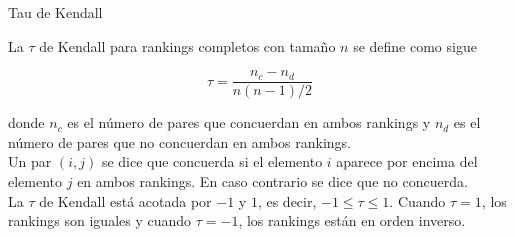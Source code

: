\documentclass[10pt]{beamer}
\begin{document}
	\begin{frame}{Tau de Kendall}
		\begin{defi}
			La $\tau$ de Kendall para rankings completos con tamaño $n$ se define como sigue
			
			\begin{equation} \label{def:tau_kendall}
			\tau = \dfrac{n_c - n_d}{n(n-1)/2}
			\end{equation}
			
			donde $n_c$ es el número de pares que concuerdan en ambos rankings y $n_d$ es el número de pares que no concuerdan en ambos rankings.\\
			
			Un par $(i,j)$ se dice que concuerda si el elemento $i$ aparece por encima del elemento $j$ en ambos rankings. En caso contrario se dice que no concuerda.\\
			
			La $\tau$ de Kendall está acotada por $-1$ y $1$, es decir, $-1 \leq \tau \leq 1$. Cuando $\tau = 1$, los rankings son iguales y cuando $\tau = -1$, los rankings están en orden inverso.  
		\end{defi}
	\end{frame}
	
\end{document}
